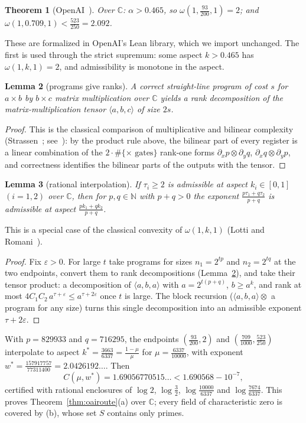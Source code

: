 \documentclass[11pt]{article}
\newtheorem{theorem}{Theorem}[section]
\newtheorem{lemma}[theorem]{Lemma}
\theoremstyle{definition}
\theoremstyle{remark}
\newcommand{\C}{\mathbb{C}}
\newcommand{\N}{\mathbb{N}}
\begin{document}
\begin{theorem}[OpenAI~\cite{OAI2026b,OAI2026lean}]\label{thm:oai}
Over $\C$: $\alpha>0.465$, so $\omega(1,\tfrac{93}{200},1)=2$; and $\omega(1,0.709,1)<\tfrac{523}{250}=2.092$.
\end{theorem}
These are formalized in OpenAI's Lean library, which we import unchanged. The first is used through the strict
supremum: some aspect $k>0.465$ has $\omega(1,k,1)=2$, and admissibility is monotone in the aspect.

\begin{lemma}[programs give ranks]\label{lem:rank}
A correct straight-line program of cost $s$ for $a\times b$ by $b\times c$ matrix multiplication over $\C$ yields
a rank decomposition of the matrix-multiplication tensor $\langle a,b,c\rangle$ of size $2s$.
\end{lemma}
\begin{proof}
This is the classical comparison of multiplicative and bilinear complexity
(Strassen~\cite{Strassen1973}; see~\cite[Ch.~14]{BCS1997}): by the product rule above, the bilinear part of every
register is a linear combination of the $2\cdot\#\{\times\text{ gates}\}$ rank-one forms
$\partial_xp\otimes\partial_yq$, $\partial_xq\otimes\partial_yp$, and correctness identifies the bilinear parts of
the outputs with the tensor.
\end{proof}

\begin{lemma}[rational interpolation]\label{lem:interp}
If $\tau_i\ge2$ is admissible at aspect $k_i\in[0,1]$ $(i=1,2)$ over $\C$, then for $p,q\in\N$ with $p+q>0$ the
exponent $\frac{p\tau_1+q\tau_2}{p+q}$ is admissible at aspect $\frac{pk_1+qk_2}{p+q}$.
\end{lemma}
This is a special case of the classical convexity of $\omega(1,k,1)$ (Lotti and Romani~\cite{LottiRomani1983}).
\begin{proof}
Fix $\varepsilon>0$. For large $t$ take programs for sizes $n_1=2^{tp}$ and $n_2=2^{tq}$ at the two endpoints,
convert them to rank decompositions (Lemma~\ref{lem:rank}), and take their tensor product: a decomposition of
$\langle a,b,a\rangle$ with $a=2^{t(p+q)}$, $b\ge a^{k}$, and rank at most
$4C_1C_2\,a^{\tau+\varepsilon}\le a^{\tau+2\varepsilon}$ once $t$ is large. The block recursion
($\langle a,b,a\rangle\otimes$ a program for any size) turns this single decomposition into an admissible exponent
$\tau+2\varepsilon$.
\end{proof}

With $p=829933$ and $q=716295$, the endpoints $(\frac{93}{200},2)$ and $(\frac{709}{1000},\frac{523}{250})$
interpolate to aspect $k^\ast=\frac{3663}{6337}=\frac{1-\mu}{\mu}$ for $\mu=\frac{6337}{10000}$, with exponent
$w^\ast=\frac{157917757}{77311400}=2.0426192\ldots$. Then
\[
C(\mu,w^\ast)=1.69056770515\ldots<1.690568-10^{-7},
\]
certified with rational enclosures of $\log2$, $\log\frac32$, $\log\frac{10000}{6337}$ and
$\log\frac{7674}{6337}$. This proves Theorem~\ref{thm:oairoute}(a) over $\C$; every field of characteristic zero is
covered by (b), whose set $S$ contains only primes.
\end{document}
